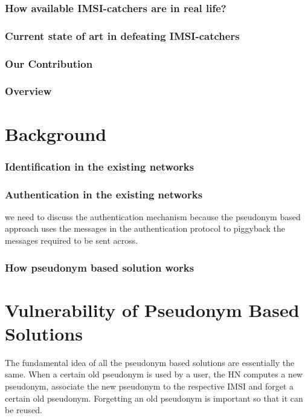\documentclass{llncs} %
\begin{document}
\subsubsection{How available IMSI-catchers are in real life?}

\subsubsection{Current state of art in defeating IMSI-catchers}

\subsubsection{Our Contribution}

\subsubsection{Overview}


\section{Background}

\subsubsection{Identification in the existing networks}
\subsubsection{Authentication in the existing networks} we need to discuss the authentication mechanism because the pseudonym based approach uses the messages in the authentication protocol to piggyback the messages required to be sent across.
\subsubsection{How pseudonym based solution works}


\section{Vulnerability of Pseudonym Based Solutions}
The fundamental idea of all the pseudonym based solutions \cite{CCS15,SSR15,Ginzboorg_Niemi_2016,Norrman_Naslund_Dubrova_2016} are essentially the same. When a certain old pseudonym is  used by a user, the HN computes a new pseudonym, associate the new pseudonym to the respective IMSI and forget a certain old pseudonym. Forgetting an old pseudonym is important so that it can be reused. 
\end{document}
